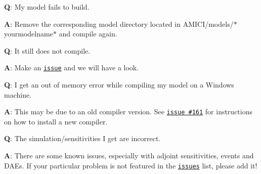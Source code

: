 {\bfseries Q}\+: My model fails to build.

{\bfseries A}\+: Remove the corresponding model directory located in A\+M\+I\+C\+I/models/$\ast$yourmodelname$\ast$ and compile again. 



{\bfseries Q}\+: It still does not compile.

{\bfseries A}\+: Make an \href{https://github.com/ICB-DCM/AMICI/issues}{\tt issue} and we will have a look. 



{\bfseries Q}\+: I get an out of memory error while compiling my model on a Windows machine.

{\bfseries A}\+: This may be due to an old compiler version. See \href{https://github.com/ICB-DCM/AMICI/issues/161}{\tt issue \#161} for instructions on how to install a new compiler. 



{\bfseries Q}\+: The simulation/sensitivities I get are incorrect.

{\bfseries A}\+: There are some known issues, especially with adjoint sensitivities, events and D\+A\+Es. If your particular problem is not featured in the \href{https://github.com/ICB-DCM/AMICI/issues}{\tt issues} list, please add it! 
